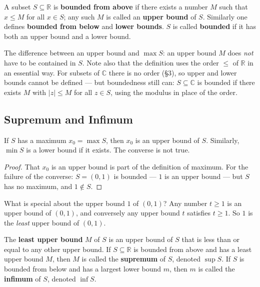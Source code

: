\documentclass[11pt]{report}
\begin{document}
\begin{defbox}
A subset $S \subseteq \mathbb{R}$ is \textbf{bounded from above} if there exists a number $M$ such that $x \leq M$ for all $x \in S$; any such $M$ is called an \textbf{upper bound} of $S$. Similarly one defines \textbf{bounded from below} and \textbf{lower bounds}. $S$ is called \textbf{bounded} if it has both an upper bound and a lower bound.
\end{defbox}

\begin{rembox}
The difference between an upper bound and $\max S$: an upper bound $M$ does \emph{not} have to be contained in $S$. Note also that the definition uses the order $\leq$ of $\mathbb{R}$ in an essential way. For subsets of $\mathbb{C}$ there is no order (\S 3), so upper and lower bounds cannot be defined --- but boundedness still can: $S \subseteq \mathbb{C}$ is bounded if there exists $M$ with $|z| \leq M$ for all $z \in S$, using the modulus in place of the order.
\end{rembox}

\subsection{Supremum and Infimum}

\begin{propbox}
If $S$ has a maximum $x_0 = \max S$, then $x_0$ is an upper bound of $S$. Similarly, $\min S$ is a lower bound if it exists. The converse is not true.
\end{propbox}

\begin{proof}
That $x_0$ is an upper bound is part of the definition of maximum. For the failure of the converse: $S = (0,1)$ is bounded --- $1$ is an upper bound --- but $S$ has no maximum, and $1 \notin S$.
\end{proof}

What is special about the upper bound $1$ of $(0,1)$? Any number $t \geq 1$ is an upper bound of $(0,1)$, and conversely any upper bound $t$ satisfies $t \geq 1$. So $1$ is the \emph{least} upper bound of $(0,1)$.

\begin{defbox}
The \textbf{least upper bound} $M$ of $S$ is an upper bound of $S$ that is less than or equal to any other upper bound. If $S \subseteq \mathbb{R}$ is bounded from above and has a least upper bound $M$, then $M$ is called the \textbf{supremum} of $S$, denoted $\sup S$. If $S$ is bounded from below and has a largest lower bound $m$, then $m$ is called the \textbf{infimum} of $S$, denoted $\inf S$.
\end{defbox}
\end{document}
